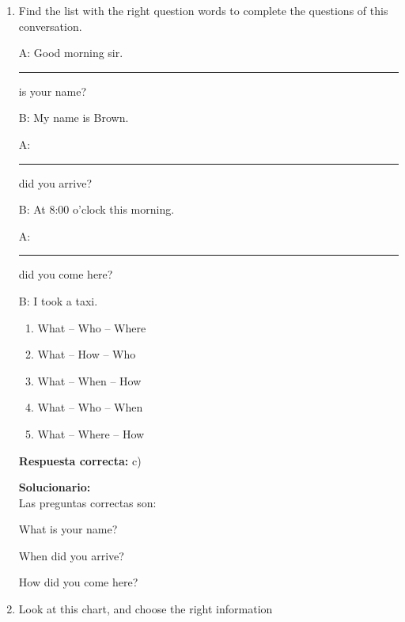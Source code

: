 \begin{enumerate}
	
	\item Find the list with the right question words to complete the questions of this conversation.
	
	A: Good morning sir. \rule{1.5cm}{0.4pt} is your name?
	
	B: My name is Brown.
	
	A: \rule{1.5cm}{0.4pt} did you arrive?
	
	B: At 8:00 o'clock this morning.
	
	A: \rule{1.5cm}{0.4pt} did you come here?
	
	B: I took a taxi.
	
	\begin{enumerate}[label=\alph*)]
		\item What -- Who -- Where
		\item What -- How -- Who
		\item What -- When -- How
		\item What -- Who -- When
		\item What -- Where -- How
	\end{enumerate}
	\textbf{Respuesta correcta:} c)
	
	\vspace{2mm}
	\textbf{Solucionario:}\\
	Las preguntas correctas son:
	
	What is your name?
	
	When did you arrive?
	
	How did you come here?
	
	\vspace{6mm}
	
	\item Look at this chart, and choose the right information
	
\begin{center}
\end{center}
\end{enumerate}
